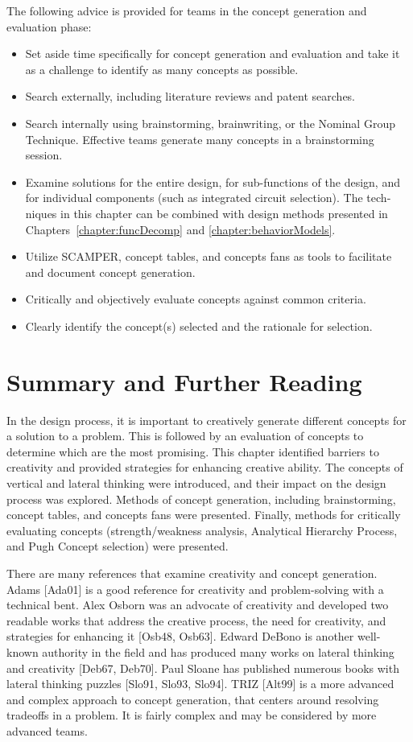 The following advice is provided for teams in the concept generation and
evaluation phase:

\begin{itemize}
\item
  Set aside time specifically for concept generation and evaluation and
  take it as a challenge to identify as many concepts as possible.
\item
  Search externally, including literature reviews and patent searches.
\item
  Search internally using brainstorming, brainwriting, or the Nominal
  Group Technique. Effective teams generate many concepts in a
  brainstorming session.
\item
  Examine solutions for the entire design, for sub-functions of the
  design, and for individual components (such as integrated circuit
  selection). The tech­niques in this chapter can be combined with design
  methods presented in 
  Chapters~\ref{chapter:funcDecomp}  and \ref{chapter:behaviorModels}.
\item
  Utilize SCAMPER, concept tables, and concepts fans as tools to
  facilitate and document concept generation.
\item
  Critically and objectively evaluate concepts against common criteria.
\item
  Clearly identify the concept(s) selected and the rationale for
  selection.
\end{itemize}

\section{Summary and Further Reading}
\label{section:summary-and-further-reading}

In the design process, it is important to creatively generate different
concepts for a solution to a problem. This is followed by an evaluation
of concepts to determine which are the most promising. This chapter
identified barriers to creativity and provided strategies for enhancing
creative ability. The concepts of vertical and lateral thinking were
introduced, and their im­pact on the design process was explored. Methods
of concept generation, including brainstorming, concept tables, and
concepts fans were presented. Finally, methods for critically evaluating
concepts (strength/weakness analysis, Analytical Hierarchy Process, and
Pugh Concept selection) were presented.

There are many references that examine creativity and concept
generation. Adams {[}Ada01{]} is a good reference for creativity and
problem-solving with a technical bent. Alex Os­born was an advocate of
creativity and developed two readable works that address the creative
process, the need for creativity, and strategies for enhancing it
{[}Osb48, Osb63{]}. Ed­ward DeBono is another well-known authority in the
field and has produced many works on lateral thinking and creativity
{[}Deb67, Deb70{]}. Paul Sloane has published numerous books with
lateral thinking puzzles {[}Slo91, Slo93, Slo94{]}. TRIZ {[}Alt99{]} is
a more advanced and complex approach to concept generation, that centers
around resolving tradeoffs in a problem. It is fairly complex and may be
considered by more advanced teams.
